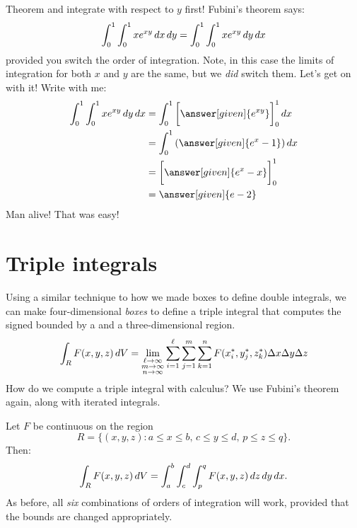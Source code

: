 \documentclass{ximera}
\begin{document}
\begin{example}
\begin{explanation}
    Theorem and integrate with respect to $y$ first! Fubini's theorem says:
    \[
    \int_0^1 \int_0^1 x e^{xy} \mathop{}\!d x \mathop{}\!d y =  \int_0^1 \int_0^1 x e^{xy} \mathop{}\!d y \mathop{}\!d x
    \]
    provided you switch the order of integration. Note, in this case
    the limits of integration for both $x$ and $y$ are the same, but
    we \textit{did} switch them. Let's get on with it! Write with me:
    \begin{align*}
      \int_0^1 \int_0^1 x e^{xy} \d y \d x &= \int_0^1 \eval{\answer[given]{e^{xy}}}_0^1\d x\\
      &= \int_0^1 \left(\answer[given]{e^x - 1}\right) \d x \\
      &= \eval{\answer[given]{e^x - x}}_0^1\\
      &= \answer[given]{e-2}
    \end{align*}
    Man alive! That was easy!
  \end{explanation}
\end{example}



\section{Triple integrals}

Using a similar technique to how we made boxes to define double
integrals, we can make four-dimensional \textit{boxes} to define a
triple integral that computes the signed
bounded by a
and a three-dimensional region.
\[
\int_R F(x,y,z) \mathop{}\!d V = \lim_{\substack{\ell\to\infty\\ m\to\infty\\ n\to\infty}}\sum_{i=1}^\ell\sum_{j=1}^m \sum_{k=1}^n F(x^*_i,y^*_j,z_k^*)\Delta x\Delta y\Delta z
\]
How do we compute a triple integral with calculus? We use Fubini's theorem again, along with iterated integrals.

\begin{theorem}
  Let $F$ be continuous on the region
  \[
  R = \{(x,y,z):\text{$a\le x\le b$, $c\le y\le d$, $p\le z\le q$}\}.
  \]
  Then:
  \[
  \int_R F(x,y,z) \mathop{}\!d V  = \int_a^b\int_c^d\int_p^q F(x,y,z)\mathop{}\!d z \mathop{}\!d y\mathop{}\!d x.
  \]
  As before, all \textit{six} combinations of orders of integration
  will work, provided that the bounds are changed appropriately. 
\end{theorem}
\end{document}
